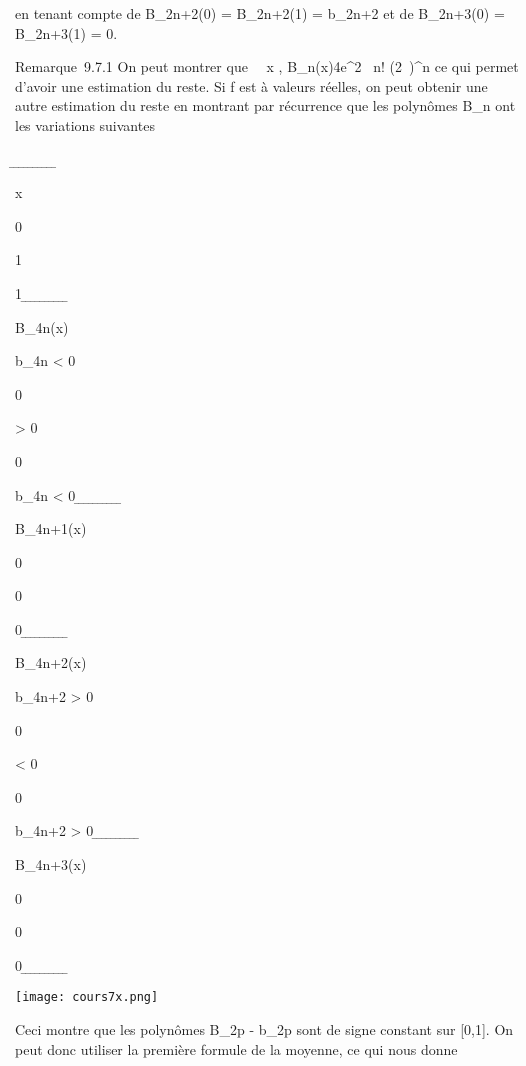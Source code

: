 \documentclass[]{article}
\begin{document}
en tenant compte de B_2n+2(0) = B_2n+2(1) =
b_2n+2 et de B_2n+3(0) = B_2n+3(1) = 0.

Remarque~9.7.1 On peut montrer que \forall~~x \in
[0,1], B_n(x)\leq 4e^2\pi~ n!
\over (2\pi~)^n ce qui permet d'avoir une
estimation du reste. Si f est à valeurs réelles, on peut obtenir une
autre estimation du reste en montrant par récurrence que les polynômes
B_n ont les variations suivantes

̲ ̲ ̲ ̲ ̲ ̲ ̲ ̲ ̲ ̲

x

0

1

1 ̲ ̲ ̲ ̲ ̲ ̲ ̲ ̲ ̲ ̲

B_4n(x)

b_4n < 0

\nearrow

0

\nearrow

> 0

\searrow

0

\searrow

b_4n < 0 ̲ ̲ ̲ ̲ ̲ ̲ ̲ ̲ ̲ ̲

B_4n+1(x)

0

\searrow

\nearrow

0

\nearrow

\searrow

0 ̲ ̲ ̲ ̲ ̲ ̲ ̲ ̲ ̲ ̲

B_4n+2(x)

b_4n+2 > 0

\searrow

0

\searrow

< 0

\nearrow

0

\nearrow

b_4n+2 > 0 ̲ ̲ ̲ ̲ ̲ ̲ ̲ ̲ ̲ ̲

B_4n+3(x)

0

\nearrow

\searrow

0

\searrow

\nearrow

0 ̲ ̲ ̲ ̲ ̲ ̲ ̲ ̲ ̲ ̲

\texttt{[image: cours7x.png]}

Ceci montre que les polynômes B_2p - b_2p sont de
signe constant sur [0,1]. On peut donc utiliser la première formule
de la moyenne, ce qui nous donne
\end{document}
